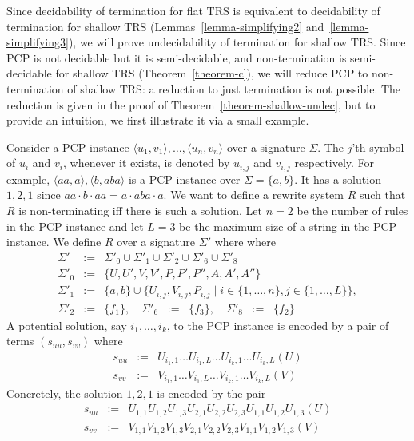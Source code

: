 \documentclass{LMCS}
\theoremstyle{plain}
\begin{document}
Since decidability of termination for flat TRS is equivalent to
decidability of termination for shallow TRS (Lemmas~\ref{lemma-simplifying2}
and~\ref{lemma-simplifying3}), we will prove 
undecidability of termination for shallow TRS.
Since PCP is not decidable but it is semi-decidable,
and non-termination is semi-decidable for shallow
TRS (Theorem~\ref{theorem-c}), we will
reduce PCP to non-termination of shallow TRS:
a reduction to just termination is not possible.
The reduction is given in the proof of 
Theorem~\ref{theorem-shallow-undec}, but
to provide an intuition, we first illustrate it via a small example.

Consider a PCP instance
$\langle u_1,v_1\rangle,\ldots, \langle u_n,v_n\rangle$
over a signature $\Sigma$. 
The $j$'th symbol of $u_i$ and $v_i$, whenever it exists,
is denoted by $u_{i,j}$ and $v_{i,j}$ respectively.
For example, 
$\langle aa,a\rangle,
 \langle b,aba\rangle$ 
is a PCP instance over $\Sigma = \{a,b\}$.  It has a
solution $1,2,1$ since $aa\cdot b\cdot aa = a\cdot aba\cdot a$.
We want to define a rewrite system $R$ such that $R$ is non-terminating
iff there is such a solution.  
Let $n = 2$ be the number of rules in the PCP instance
and let $L = 3$ be the maximum size of a string in the PCP instance.
We define $R$ over a signature $\Sigma'$ where
where
\begin{eqnarray}
 \Sigma' & := & \Sigma'_0 \cup \Sigma'_1 \cup \Sigma'_2\cup\Sigma'_6\cup\Sigma'_{8}
\nonumber
\\
 \Sigma'_0 & := & \{U,U',V,V',P,P',P'',A,A',A''\}
\nonumber
\\
 \Sigma'_1 & := & \{a,b\} \cup \{U_{i,j},V_{i,j},P_{i,j}\mid i\in\{1,\ldots,n\}, j\in\{1,\ldots,L\}\},
\nonumber
\\ 
 \Sigma'_2 & := & \{f_1\},  \quad 
 \Sigma'_6 \;\; := \;\;\{f_3\}, \quad 
 \Sigma'_8 \;\; := \;\;\{f_2\}
\label{eqn-sigma}
\end{eqnarray}
A potential solution, say $i_1,\ldots,i_k$, to the PCP instance is encoded
by a pair of terms $(s_{uu},s_{vv})$ where
\begin{eqnarray}
 s_{uu} & := & U_{i_1,1}\ldots U_{i_1,L}\ldots U_{i_k,1}\ldots U_{i_k,L}(U)
\nonumber
\\
 s_{vv} & := & V_{i_1,1}\ldots V_{i_1,L}\ldots V_{i_k,1}\ldots V_{i_k,L}(V)
\label{eqn-suu-svv}
\end{eqnarray}
Concretely, the solution $1,2,1$ is encoded by the pair
\begin{eqnarray*}
 s_{uu} & := & U_{1,1}U_{1,2}U_{1,3}U_{2,1}U_{2,2}U_{2,3}U_{1,1}U_{1,2}U_{1,3}(U)
\\
 s_{vv} & := & V_{1,1}V_{1,2}V_{1,3}V_{2,1}V_{2,2}V_{2,3}V_{1,1}V_{1,2}V_{1,3}(V)
\end{eqnarray*}
\end{document}
